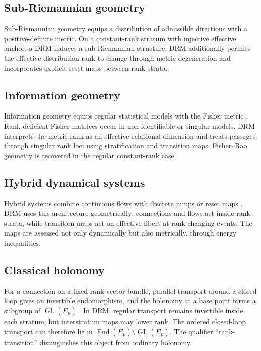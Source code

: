 \documentclass[11pt]{article}
\newcommand{\End}{\operatorname{End}}
\newcommand{\GL}{\operatorname{GL}}
\begin{document}
\subsection{Sub-Riemannian geometry}

Sub-Riemannian geometry equips a distribution of admissible directions with a
positive-definite metric. On a constant-rank stratum with injective effective
anchor, a DRM induces a sub-Riemannian structure. DRM additionally permits the
effective distribution rank to change through metric degeneration and
incorporates explicit reset maps between rank strata.

\subsection{Information geometry}

Information geometry equips regular statistical models with the Fisher metric
\cite{AmariNagaoka2000,Chentsov1982,Nielsen2020}. Rank-deficient Fisher matrices occur in
non-identifiable or singular models. DRM interprets the metric rank as an
effective relational dimension and treats passages through singular rank loci
using stratification and transition maps. Fisher--Rao geometry is recovered in
the regular constant-rank case.

\subsection{Hybrid dynamical systems}

Hybrid systems combine continuous flows with discrete jumps or reset maps
\cite{GoebelSanfeliceTeel2012}. DRM uses this architecture geometrically:
connections and flows act inside rank strata, while transition maps act on
effective fibers at rank-changing events. The maps are assessed not only
dynamically but also metrically, through energy inequalities.

\subsection{Classical holonomy}

For a connection on a fixed-rank vector bundle, parallel transport around a
closed loop gives an invertible endomorphism, and the holonomy at a base point
forms a subgroup of $\GL(E_p)$ \cite{KobayashiNomizu1963,Lee2018}. In DRM,
regular transport remains invertible inside each stratum, but interstratum
maps may lower rank. The ordered closed-loop transport can therefore lie in
$\End(\overline E_p)\setminus\GL(\overline E_p)$. The qualifier
``rank-transition'' distinguishes this object from ordinary holonomy.
\end{document}

